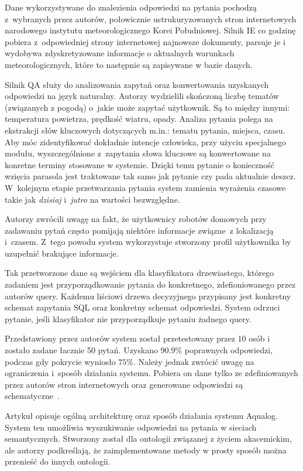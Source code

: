Dane wykorzystywane do znalezienia odpowiedzi na pytania pochodzą z~wybranych przez autorów, połowicznie ustrukuryzowanych stron internetowych narodowego instytutu meteorologicznego Korei Południowej. Silnik IE co godzinę pobiera z~odpowiedniej strony internetowej najnowsze dokumenty, parsuje je i wydobywa zdyskretyzowane informacje o aktualnych warunkach meteorologicznych, które to następnie są zapisywane w bazie danych. 

Silnik QA służy do analizowania zapytań oraz konwertowania uzyskanych odpowiedzi na język naturalny. Autorzy \cite{restrictedWeather} wydzielili skończoną liczbę tematów (związanych z pogodą) o~jakie może zapytać użytkownik. Są to między innymi: temperatura powietrza, prędkość wiatru, opady. Analiza pytania polega na ekstrakcji słów kluczowych dotyczących m.in.: tematu pytania, miejsca, czasu. Aby móc zidentyfikować dokładnie intencje człowieka, przy użyciu specjalnego modułu, wyszczególnione z~zapytania słowa kluczowe są konwertowane na konretne terminy stosowane w systemie. Dzięki temu pytanie o konieczność wzięcia parasola jest traktowane tak samo jak pytanie czy pada aktualnie deszcz. W~kolejnym etapie przetwarzania pytania system zamienia wyrażenia czasowe takie jak \textit{dzisiaj} i~\textit{jutro} na wartości bezwzględne.

Autorzy \cite{restrictedWeather} zwrócili uwagę na fakt, że użytkownicy robotów domowych przy zadawaniu pytań często pomijają niektóre informacje związne~z lokalizacją i~czasem. Z~tego powodu system wykorzystuje stworzony profil użytkownika by uzupełnić brakujące informacje.

Tak przetworzone dane są wejściem dla klasyfikatora drzewiastego, którego zadaniem jest przyporządkowanie pytania do konkretnego, zdefioniowanego przez autorów query. Każdemu liściowi drzewa decyzyjnego przypisany jest konkretny schemat zapytania SQL oraz konkretny schemat odpowiedzi. System odrzuci pytanie, jeśli klasyfikator nie przyporządkuje pytaniu żadnego query.

Przedstawiony przez autorów \cite{restrictedWeather} system został przetestowany przez 10 osób i~ zostało zadane łacznie 50 pytań. Uzyskano $\num{90.9}$\% poprawnych odpowiedzi, podczas gdy pokrycie wyniosło $\num{75}$\%. Należy jednak zwrócić uwagę na ograniczenia i~sposób działania systemu. Pobiera on dane tylko ze zdefiniowanych przez autorów stron internetowych oraz generowane odpowiedzi są schematyczne~\cite{restrictedWeather}.

Artykuł \cite{lopez2005aqualog} opisuje ogólną architekturę oraz sposób działania systemu Aqualog. System ten umożliwia wyszukiwanie odpowiedzi na pytania w sieciach semantycznych. Stworzony został dla ontologii związanej z życiem akacemickim, ale autorzy podkreślają, że zaimplementowane metody w prosty sposób można przenieść do innych ontologii.

